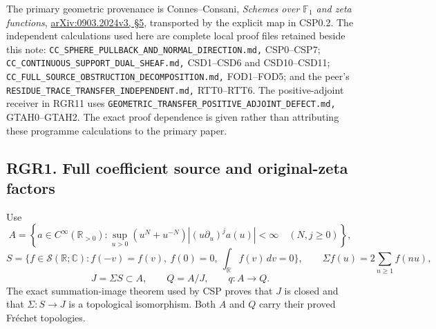 The primary geometric provenance is Connes--Consani, \emph{Schemes over
\(\mathbb F_1\) and zeta functions},
\linebreak
\href{https://arxiv.org/abs/0903.2024v3}{arXiv:0903.2024v3, §5},
transported by the explicit map in CSP0.2. The independent calculations
used here are complete local proof files retained beside this note:
\nolinkurl{CC_SPHERE_PULLBACK_AND_NORMAL_DIRECTION.md,} CSP0--CSP7;
\nolinkurl{CC_CONTINUOUS_SUPPORT_DUAL_SHEAF.md,} CSD1--CSD6 and
CSD10--CSD11; \nolinkurl{CC_FULL_SOURCE_OBSTRUCTION_DECOMPOSITION.md,}
FOD1--FOD5; and the peer's
\nolinkurl{RESIDUE_TRACE_TRANSFER_INDEPENDENT.md,} RTT0--RTT6. The
positive-adjoint receiver in RGR11 uses
\nolinkurl{GEOMETRIC_TRANSFER_POSITIVE_ADJOINT_DEFECT.md,} GTAH0--GTAH2.
The exact proof dependence is given rather than attributing these
programme calculations to the primary paper.

\subsection{RGR1. Full coefficient source and original-zeta
factors}\label{rgr1.-full-coefficient-source-and-original-zeta-factors}

Use \[
 A=\left\{a\in C^\infty(\mathbb R_{>0}):
 \sup_{u>0}(u^N+u^{-N})|(u\partial_u)^j a(u)|<\infty
 \quad(N,j\ge0)\right\},
\] \[
 S=\{f\in\mathcal S(\mathbb R;\mathbb C):f(-v)=f(v),\ f(0)=0,
 \ \int_{\mathbb R}f(v)\,dv=0\},\qquad
 \Sigma f(u)=2\sum_{n\ge1}f(nu),
\] \[
 J=\Sigma S\subset A,\qquad Q=A/J,\qquad q:A\longrightarrow Q.
 \tag{RGR1.1}
\] The exact summation-image theorem used by CSP proves that \(J\) is
closed and that \(\Sigma:S\to J\) is a topological isomorphism. Both
\(A\) and \(Q\) carry their proved Fréchet topologies.

